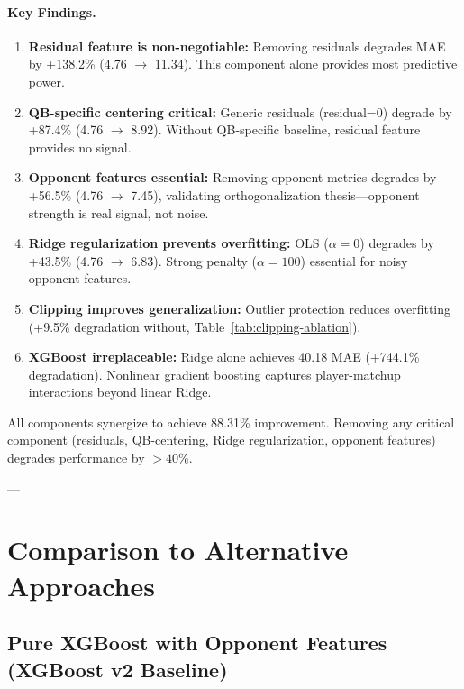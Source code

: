 \paragraph{Key Findings.}
\begin{enumerate}[itemsep=2pt,parsep=0pt]
    \item \textbf{Residual feature is non-negotiable:} Removing residuals degrades MAE by +138.2\% (4.76 $\to$ 11.34). This component alone provides most predictive power.

    \item \textbf{QB-specific centering critical:} Generic residuals (residual=0) degrade by +87.4\% (4.76 $\to$ 8.92). Without QB-specific baseline, residual feature provides no signal.

    \item \textbf{Opponent features essential:} Removing opponent metrics degrades by +56.5\% (4.76 $\to$ 7.45), validating orthogonalization thesis---opponent strength is real signal, not noise.

    \item \textbf{Ridge regularization prevents overfitting:} OLS ($\alpha = 0$) degrades by +43.5\% (4.76 $\to$ 6.83). Strong penalty ($\alpha = 100$) essential for noisy opponent features.

    \item \textbf{Clipping improves generalization:} Outlier protection reduces overfitting (+9.5\% degradation without, Table~\ref{tab:clipping-ablation}).

    \item \textbf{XGBoost irreplaceable:} Ridge alone achieves 40.18 MAE (+744.1\% degradation). Nonlinear gradient boosting captures player-matchup interactions beyond linear Ridge.
\end{enumerate}

All components synergize to achieve 88.31\% improvement. Removing any critical component (residuals, QB-centering, Ridge regularization, opponent features) degrades performance by $> 40\%$.

---

\section{Comparison to Alternative Approaches}
\label{sec:alternatives}

\subsection{Pure XGBoost with Opponent Features (XGBoost v2 Baseline)}

